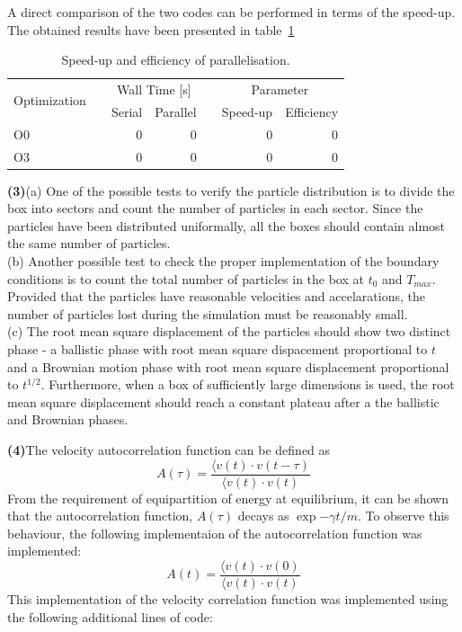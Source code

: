 \documentclass[11pt, oneside]{article}
\begin{document}
A direct comparison of the two codes can be performed in terms of the speed-up. The obtained results have been presented in  table~\ref{tab:su}
\begin{table}[h]
  \caption{Speed-up and efficiency of parallelisation.}
  \label{tab:su}
  \centering
  \begin{tabular}{lcrrcrr}
    \toprule
    \multirow{2}{*}{Optimization} &\phantom{abc} & \multicolumn{2}{c}{Wall Time [s]} &\phantom{abc} & \multicolumn{2}{c}{Parameter} \\
    \cmidrule{3-4} \cmidrule{6-7}
    &\phantom{abc} & {Serial} & {Parallel} & \phantom{abc} & {Speed-up} & {Efficiency}\\
    \midrule
    O0 && 0 & 0 && 0 & 0\\
    O3 && 0 & 0 && 0 & 0\\
    \bottomrule
  \end{tabular}
\end{table}

\textbf{(3)}\quad (a) One of the possible tests to verify the particle distribution is to divide the box into sectors and count the number of particles in each sector. Since the particles have been distributed uniformally, all the boxes should contain almost the same number of particles.\\
(b) Another possible test to check the proper implementation of the boundary conditions is to count the total number of particles in the box at \(t_0\) and \(T_{max}\). Provided that the particles have reasonable velocities and accelarations, the number of particles lost during the simulation must be reasonably small.\\ (c) The root mean square displacement of the particles should show two distinct phase - a ballistic phase with root mean square dispacement proportional to \(t\) and a Brownian motion phase with root mean square displacement proportional to \(t^{1/2}\). Furthermore, when a box of sufficiently large dimensions is used, the root mean square displacement should reach a constant plateau after a the ballistic and Brownian phases.     

\textbf{(4)}\quad The velocity autocorrelation function can be defined as \[A(\tau) = \frac{\langle v(t) \cdot v(t-\tau)}{\langle v(t) \cdot v(t)}\] From the requirement of equipartition of energy at equilibrium, it can be shown that the autocorrelation function, \(A(\tau)\) decays as \(\exp{-\gamma t / m}\). To observe this behaviour, the following implementaion of the autocorrelation function was implemented: \[A(t) = \frac{\langle v(t) \cdot v(0)}{\langle v(t) \cdot v(t)}\] This implementation of the velocity correlation function was implemented using the following additional lines of code:
\end{document}
